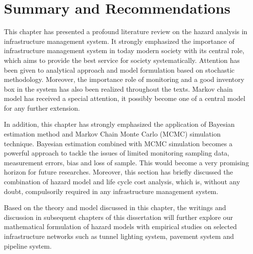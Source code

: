 \section{Summary and Recommendations}
\label{28}
This chapter has presented a profound literature review on the hazard analysis in infrastructure management system. It strongly emphasized the importance of infrastructure management system in today modern society with its central role, which aims to provide the best service for society systematically. Attention has been given to analytical approach and model formulation based on stochastic methodology. Moreover, the importance role of monitoring and a good inventory box in the system has also been realized throughout the texts. Markov chain model has received a special attention, it possibly become one of a central model for any further extension.

In addition, this chapter has strongly emphasized the application of Bayesian estimation method and Markov Chain Monte Carlo (MCMC) simulation technique. Bayesian estimation combined with MCMC simulation becomes a powerful approach to tackle the issues of limited monitoring sampling data, measurement errors, bias and loss of sample. This would become a very promising horizon for future researches. Moreover, this section has briefly discussed the combination of hazard model and life cycle cost analysis, which is, without any doubt, compulsorily required in any infrastructure management system.

Based on the theory and model discussed in this chapter, the writings and discussion in subsequent chapters of this dissertation will further explore our mathematical formulation of hazard models with empirical studies on selected infrastructure networks such as tunnel lighting system, pavement system and pipeline system.


